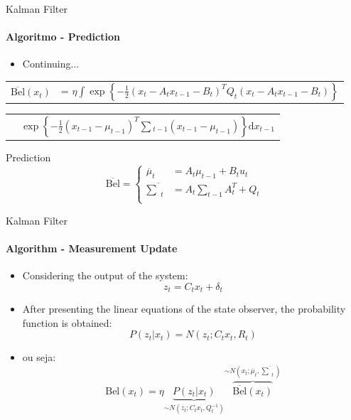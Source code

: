 \documentclass[aspectratio=169]{beamer}
\begin{document}
\begin{frame}[c]{Kalman Filter}
    \framesubtitle{Algoritmo - Prediction}

    \begin{itemize}
        \item Continuing...
    \end{itemize}

    \begin{tabular}{p{1.2cm} l}      
        $\overline{\text{Bel}}(x_t)$  & = $\eta \displaystyle\int \exp\left\{  -\frac{1}{2} \left(x_t - A_t x_{t-1} - B_t\right)^T Q_t \left(x_t - A_t x_{t-1} - B_t\right)  \right\}$ \\
    \end{tabular}
        
    \begin{tabular}{p{2.3cm} l}
        & $\exp\left\{ -\displaystyle\frac{1}{2} \left(x_{t-1} - \mu_{t-1}\right)^T \textstyle\sum {}_{t-1} \left(x_{t-1} - \mu_{t-1}\right)  \right\}\text{d}x_{t-1}$
    \end{tabular}    

    \begin{block}{Prediction}
        \begin{equation}
            \overline{\text{Bel}} = 
            \left\{
            \begin{aligned}
                    \overline{\mu}_t & = A_t\mu_{t-1} + B_t u_t\\
                    \overline{\textstyle\sum}_t & = A_t {\textstyle\sum}_{t-1} A_t^T+ Q_t\\
            \end{aligned} \right.
        \end{equation}
    \end{block} 
\end{frame}


\begin{frame}[c]{Kalman Filter}
    \framesubtitle{Algorithm - Measurement Update}
    \begin{itemize}
        \item Considering the output of the system:
        \begin{equation*}
            z_t = C_t x_t + \delta_t
        \end{equation*}
        \item After presenting the linear equations of the state observer, the probability function is obtained:
        \begin{equation*}
            P(z_t| x_t)= N\left(z_t; C_t x_t, R_t\right)
        \end{equation*}   
        \item ou seja:
        \begin{equation*}
            \text{Bel}(x_t)  = \eta \underbrace{P(z_t|x_t)}_{\sim N\left(z_t; C_t x_t, Q_t^{-1}\right)} \overbrace{\overline{\text{Bel}}(x_t)}^{\sim N\left(x_t; \overline{\mu}_t, \overline{\textstyle\sum}_t\right)}
        \end{equation*}
    \end{itemize}
\end{frame}
\end{document}
